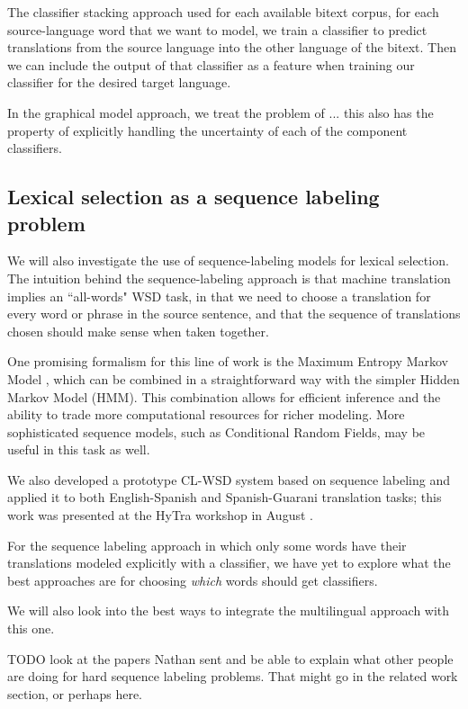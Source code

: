 The classifier stacking approach used 
for each available bitext corpus, for each source-language word that we want to
model, we train a classifier to predict translations from the source language
into the other language of the bitext.
Then we can include the output of that classifier as a feature when training
our classifier for the desired target language.


In the graphical model approach, we treat the problem of 
... this also has the property of explicitly handling the uncertainty of each
of the component classifiers.

\subsection{Lexical selection as a sequence labeling problem}
We will also investigate the use of sequence-labeling models for lexical
selection.  The intuition behind the sequence-labeling approach is that machine
translation implies an ``all-words" WSD task, in that we need to choose a
translation for every word or phrase in the source sentence, and that the
sequence of translations chosen should make sense when taken together.

One promising formalism for this line of work is the Maximum Entropy Markov
Model \cite{icml00/mccallum}, which can be combined in a straightforward way
with the simpler Hidden Markov Model (HMM).
This combination allows for efficient inference and the ability to trade more
computational resources for richer modeling. More sophisticated sequence
models, such as Conditional Random Fields, may be useful in this task as well.

We also developed a prototype CL-WSD system based on sequence labeling and
applied it to both English-Spanish and Spanish-Guarani translation tasks; this
work was presented at the HyTra workshop in August
\cite{rudnick-gasser:2013:HyTra-2013}.

For the sequence labeling approach in which only some words have their
translations modeled explicitly with a classifier, we have yet to explore what
the best approaches are for choosing \emph{which} words should get classifiers.

We will also look into the best ways to integrate the multilingual approach
with this one.

TODO look at the papers Nathan sent and be able to explain what other people
are doing for hard sequence labeling problems. That might go in the related
work section, or perhaps here.

